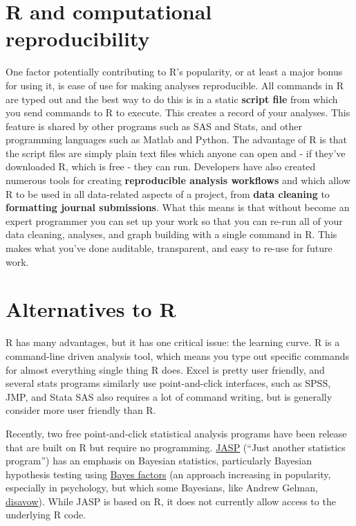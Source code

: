 \documentclass[
]{book}
\begin{document}
\hypertarget{r-and-computational-reproducibility}{%
\section{R and computational reproducibility}\label{r-and-computational-reproducibility}}

One factor potentially contributing to R's popularity, or at least a major bonus for using it, is ease of use for making analyses reproducible. All commands in R are typed out and the best way to do this is in a static \textbf{script file} from which you send commands to R to execute. This creates a record of your analyses. This feature is shared by other programs such as SAS and Stats, and other programming languages such as Matlab and Python. The advantage of R is that the script files are simply plain text files which anyone can open and - if they've downloaded R, which is free - they can run. Developers have also created numerous tools for creating \textbf{reproducible analysis workflows} and which allow R to be used in all data-related aspects of a project, from \textbf{data cleaning} to \textbf{formatting journal submissions}. What this means is that without become an expert programmer you can set up your work so that you can re-run all of your data cleaning, analyses, and graph building with a single command in R. This makes what you've done auditable, transparent, and easy to re-use for future work.

\hypertarget{alternatives-to-r}{%
\section{Alternatives to R}\label{alternatives-to-r}}

R has many advantages, but it has one critical issue: the learning curve. R is a command-line driven analysis tool, which means you type out specific commands for almost everything single thing R does. Excel is pretty user friendly, and several stats programs similarly use point-and-click interfaces, such as SPSS, JMP, and Stata SAS also requires a lot of command writing, but is generally consider more user friendly than R.

Recently, two free point-and-click statistical analysis programs have been release that are built on R but require no programming. \href{https://jasp-stats.org/}{JASP} (``Just another statistics program'') has an emphasis on Bayesian statistics, particularly Bayesian hypothesis testing using \href{https://en.wikipedia.org/wiki/Bayes_factor}{Bayes factors} (an approach increasing in popularity, especially in psychology, but which some Bayesians, like Andrew Gelman, \href{http://andrewgelman.com/2011/04/02/so-called_bayes/}{disavow}). While JASP is based on R, it does not currently allow access to the underlying R code.
\end{document}
